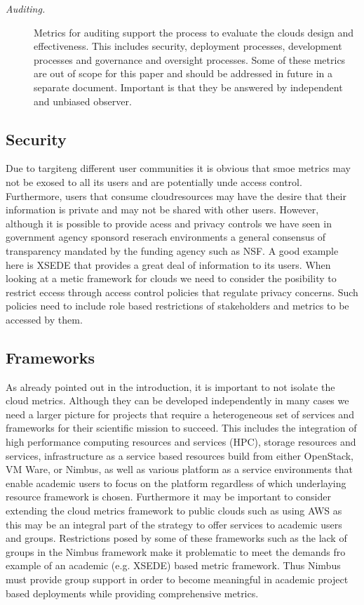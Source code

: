 \documentclass{sig-alternate-05-2015}
\begin{document}
\begin{description}
\item[\it Auditing.] Metrics for auditing support the process to evaluate
  the clouds design and effectiveness. This includes security,
  deployment processes, development processes and governance and
  oversight  processes. Some of these metrics are out of scope for
  this paper and should be addressed in future in a separate document.
  Important is that they be answered by independent and unbiased
  observer.

\end{description}


\subsection{Security}

Due to targiteng different user communities it is obvious that smoe
metrics may not be exosed to all its users and are potentially unde
access control. Furthermore, users that consume cloudresources may
have the desire that their information is private and may not be
shared with other users. However, although it is possible to provide
acess and privacy controls we have seen in government agency sponsord
reserach environments a general consensus of transparency mandated by
the funding agency such as NSF. A good example here is XSEDE that
provides a great deal of information to its users. When looking at a
metic framework for clouds we need to consider the posibility to
restrict eccess through access control policies that regulate privacy
concerns. Such policies need to include role based restrictions of
stakeholders and metrics to be accessed by them.

\subsection{Frameworks}

As already pointed out in the introduction, it is important to not
isolate the cloud metrics. Although they can be developed
independently in many cases we need a larger picture for projects that
require a heterogeneous set of services and frameworks for their
scientific mission to succeed.  This includes the integration of high
performance computing resources and services (HPC), storage resources
and services, infrastructure as a service based resources build from
either OpenStack, VM Ware, or Nimbus, as well as various platform as a
service environments that enable academic users to focus on the
platform regardless of which underlaying resource framework is chosen.
Furthermore it may be important to consider extending the cloud
metrics framework to public clouds such as using AWS as this may be an
integral part of the strategy to offer services to academic users and
groups. Restrictions posed by some of these frameworks such as the
lack of groups in the Nimbus framework make it problematic to meet the
demands fro example of an academic (e.g. XSEDE) based metric
framework. Thus Nimbus must provide group support in order to become
meaningful in academic project based deployments while providing
comprehensive metrics.
\end{document}

